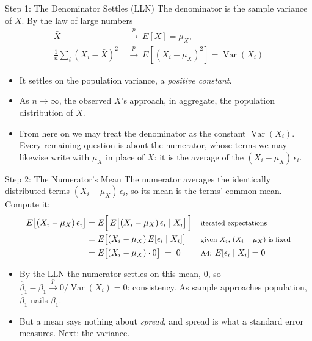 \documentclass[aspectratio=169,11pt,xcolor=dvipsnames]{beamer}
\DeclareMathOperator{\Var}{Var}
\newcommand{\E}{E}
\newcommand{\pto}{\overset{p}{\longrightarrow}}
\begin{document}
\begin{frame}{Step 1: The Denominator Settles (LLN)}
The denominator is the sample variance of $X$. By the law of large numbers
\begin{align*}
  \bar X \ &\pto\ \E[X] = \mu_X , \\
  \frac1n\sum_i (X_i - \bar X)^2 \ &\pto\ \E[ (X_i - \mu_X)^2 ] = \Var(X_i)
\end{align*}
\begin{itemize}
      \item It settles on the population variance, a \emph{positive constant}.
      \item As $n \to \infty$, the observed $X$'s approach, in aggregate, the
        population distribution of $X$.
      \item From here on we may treat the denominator as the constant $\Var(X_i)$. Every
remaining question is about the numerator, whose terms we may likewise write
with $\mu_X$ in place of $\bar X$: it is the average of the
$(X_i - \mu_X)\,\epsilon_i$.
\end{itemize} 
\end{frame}

\begin{frame}{Step 2: The Numerator's Mean}
The numerator averages the identically distributed terms
$(X_i - \mu_X)\,\epsilon_i$, so its mean is the terms' common mean. Compute it:
\begin{align*}
  \E\big[(X_i - \mu_X)\,\epsilon_i\big]
  &= \E\Big[\,\E\big[(X_i - \mu_X)\,\epsilon_i \mid X_i\big]\,\Big]
    && \text{\footnotesize iterated expectations} \\
  &= \E\big[(X_i - \mu_X)\,\E[\epsilon_i \mid X_i]\big]
    && \text{\footnotesize given $X_i$, $(X_i-\mu_X)$ is fixed} \\
  &= \E\big[(X_i - \mu_X)\cdot 0\big] \;=\; 0
    && \text{\footnotesize A4: } \E[\epsilon_i \mid X_i] = 0
\end{align*}
\begin{itemize}\itemsep3pt
  \item By the LLN the numerator settles on this mean, $0$, so
        $\hat\beta_1 - \beta_1 \pto 0/\Var(X_i) = 0$: \alert{consistency}.
        As sample approaches population, $\hat\beta_1$ nails $\beta_1$.
  \item But a mean says nothing about \emph{spread}, and spread is what a
        standard error measures. Next: the variance.
\end{itemize}
\end{frame}
\end{document}
